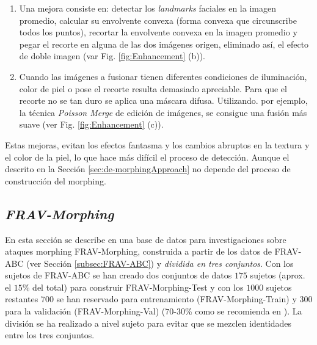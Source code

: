 \begin{enumerate}
\item 
Una mejora consiste en: detectar los \textit{\glspl{landmark}} faciales en la imagen promedio, calcular su envolvente convexa (forma convexa que circunscribe todos los puntos), recortar la envolvente convexa en la imagen promedio y pegar el recorte en alguna de las dos imágenes origen, eliminado así, el efecto de doble imagen (var Fig. {\ref{fig:Enhancement} (b)}). 

\item 
Cuando las imágenes a fusionar tienen diferentes condiciones de iluminación, color de piel o pose el recorte resulta demasiado apreciable. Para que el recorte no se tan duro se aplica una máscara difusa. Utilizando. por ejemplo, la técnica \textit{Poisson Merge} \cite{perez2003poisson} de edición de imágenes, se consigue una fusión más suave (ver Fig. \ref{fig:Enhancement} (c)).
\end{enumerate}

Estas mejoras, evitan los efectos fantasma y los cambios abruptos en la textura y el color de la piel, lo que hace más difícil el proceso de detección. Aunque el  descrito en la Sección \ref{sec:de-morphingApproach} no depende del proceso de construcción del \gls{morphing}.

\subsection{\textit{FRAV-Morphing}}\label{subsec:FRAV-Morphing}

En esta sección se describe en una base de datos para investigaciones sobre ataques \gls{morphing} \Gls{FRAV-Morphing}, construida a partir de los datos de \Gls{FRAV-ABC} (ver Sección \ref{subsec:FRAV-ABC}) y \textit{dividida en tres conjuntos}. Con los sujetos de \Gls{FRAV-ABC} se han creado dos conjuntos de datos $175$ sujetos (aprox. el $15$\% del total) para construir \Gls{FRAV-Morphing-Test} y con los $1000$ sujetos restantes $700$ se han reservado para entrenamiento (\Gls{FRAV-Morphing-Train}) y $300$ para la validación (\Gls{FRAV-Morphing-Val})
($70$-$30$\% como se recomienda en \cite{deepLearningBook}). La división se ha realizado a nivel sujeto para evitar que se mezclen identidades entre los tres conjuntos.

